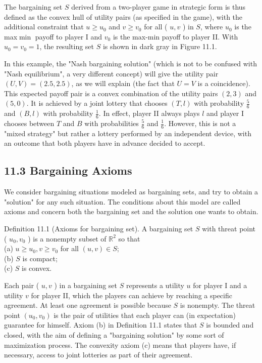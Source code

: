 \documentclass[12pt]{article}
\begin{document}
The bargaining set $S$ derived from a two-player game in strategic form is thus defined as the convex hull of utility pairs (as specified in the game), with the additional constraint that $u \geq u_{0}$ and $v \geq v_{0}$ for all ( $u, v$ ) in $S$, where $u_{0}$ is the max$\min$ payoff to player I and $v_{0}$ is the max-min payoff to player II. With $u_{0}=v_{0}=1$, the resulting set $S$ is shown in dark gray in Figure 11.1.

In this example, the "Nash bargaining solution" (which is not to be confused with "Nash equilibrium", a very different concept) will give the utility pair $(U, V)=(2.5,2.5)$, as we will explain (the fact that $U=V$ is a coincidence). This expected payoff pair is a convex combination of the utility pairs $(2,3)$ and $(5,0)$. It is achieved by a joint lottery that chooses $(T, l)$ with probability $\frac{5}{6}$ and $(B, l)$ with probability $\frac{1}{6}$. In effect, player II always plays $l$ and player I chooses between $T$ and $B$ with probabilities $\frac{5}{6}$ and $\frac{1}{6}$. However, this is not a "mixed strategy" but rather a lottery performed by an independent device, with an outcome that both players have in advance decided to accept.

\subsection*{11.3 Bargaining Axioms}
We consider bargaining situations modeled as bargaining sets, and try to obtain a "solution" for any such situation. The conditions about this model are called axioms and concern both the bargaining set and the solution one wants to obtain.

Definition 11.1 (Axioms for bargaining set). A bargaining set $S$ with threat point ( $u_{0}, v_{0}$ ) is a nonempty subset of $\mathbb{R}^{2}$ so that\\
(a) $u \geq u_{0}, v \geq v_{0}$ for all $(u, v) \in S$;\\
(b) $S$ is compact;\\
(c) $S$ is convex.

Each pair ( $u, v$ ) in a bargaining set $S$ represents a utility $u$ for player I and a utility $v$ for player II, which the players can achieve by reaching a specific agreement. At least one agreement is possible because $S$ is nonempty. The threat point $\left(u_{0}, v_{0}\right)$ is the pair of utilities that each player can (in expectation) guarantee for himself. Axiom (b) in Definition 11.1 states that $S$ is bounded and closed, with the aim of defining a "bargaining solution" by some sort of maximization process. The convexity axiom (c) means that players have, if necessary, access to joint lotteries as part of their agreement.
\end{document}
